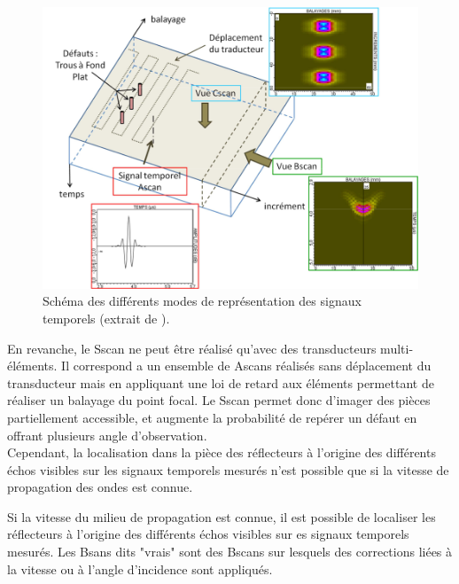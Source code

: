 
\begin{figure}
	\centering
	\includegraphics[scale=0.7]{img/scan2.png}
	\caption{\label{scan2} Schéma des différents modes de représentation des signaux temporels (extrait de \cite{bannouf}).}
\end{figure}

En revanche, le Sscan ne peut être réalisé qu'avec des transducteurs multi-éléments. Il correspond a un ensemble de Ascans réalisés sans déplacement du transducteur mais en appliquant une loi de retard aux éléments permettant de réaliser un balayage du point focal. Le Sscan permet donc d'imager des pièces partiellement accessible, et augmente la probabilité de repérer un défaut en offrant plusieurs angle d'observation.\\

Cependant, la localisation dans la pièce des réflecteurs à l'origine des différents échos visibles sur les signaux temporels mesurés n'est possible que si la vitesse de propagation des ondes est connue.

Si la vitesse du milieu de propagation est connue, il est possible de localiser les réflecteurs à l'origine des différents échos visibles sur es signaux temporels mesurés. Les Bsans dits "vrais" sont des Bscans sur lesquels des corrections liées à la vitesse ou à l'angle d'incidence sont appliqués.


